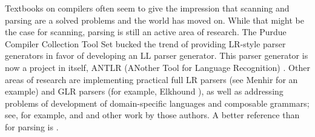 Textbooks on compilers often seem to give the impression that scanning and parsing are a solved problems and the world has moved on. While that might be the case for scanning, parsing is still an active area of research. The Purdue Compiler Collection Tool Set bucked the trend of providing LR-style parser generators in favor of developing an LL parser generator. This parser generator is now a project in itself, ANTLR (ANother Tool for Language Recognition) \citep{Parr:ANTLR:1995}. Other areas of research are implementing practical full LR parsers (see Menhir \citep{Pottier:Menhir:2007} for an example) and GLR parsers (for example, Elkhound \cite{McPeak:Elkhound:2002}), as well as addressing problems of development of domain-specific languages and composable grammars; see, for example, \citet{Wyk:Context-aware:2007} and \citet{Bravenboer:Concrete:2004} and other work by those authors.\nocite{Bravenboer:Declarative:2006}\nocite{Bravenboer:Preventing:2007} A better reference than \citet{Aho:Compilers:2006} for parsing is \citet{Grune:Parsing:2007}.
